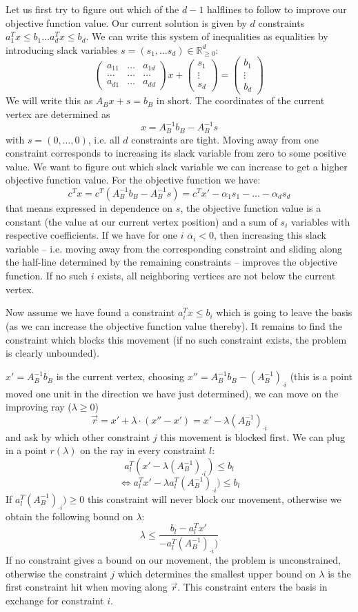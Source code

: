 \documentclass{article}
\newcommand{\setR}{\mathbb{R}}
\newcommand{\mat}[1]{ \begin{pmatrix} #1 \end{pmatrix}}
\begin{document}
Let us first try to figure out which of the $d-1$ halflines to follow to improve our objective function value.
Our current solution is given by $d$ constraints $a_1^Tx\leq b_1 \dots a_d^Tx \leq b_d$. We can write
this system of inequalities as equalities by introducing slack variables $s=(s_1,\dots s_d)\in \setR^d_{\geq0}$:
\[
	\mat{a_{11} & \dots & a_{1d} \\ \dots & \dots & \dots \\ a_{d1} & \dots & a_{dd}} x 
		+ \mat{s_1\\ \vdots \\ s_d} = \mat{b_1\\ \vdots \\ b_d}
\]
We will write this as $A_B x + s = b_B$ in short. The coordinates of the current vertex are determined as 
\[
	x=A_B^{-1}b_B - A_B^{-1}s	
\]
with $s=(0,\dots,0)$, i.e. all $d$ constraints are tight. Moving away from one constraint corresponds to 
increasing its slack variable from zero to some positive value. We want to figure out which slack variable
we can increase to get a higher objective function value. For the objective function we have:
\[
	c^Tx= c^T(A_B^{-1}b_B - A_B^{-1}s)= c^T x' - \alpha_1 s_1 - \dots - \alpha_d s_d
\]
that means expressed in dependence on $s$, the objective function value is a constant (the value at our current
vertex position) and a sum of $s_i$ variables with respective coefficients. If we have for one $i$ 
$\alpha_i<0$, then increasing this slack variable -- i.e. moving away from the corresponding constraint and
sliding along the half-line determined by the remaining constraints -- improves the objective function.
If no such $i$ exists, all neighboring vertices are not below the current vertex.

Now assume we have found a constraint $a_i^T x \leq b_i$
which is going to leave the basis (as we can increase the objective function value thereby). 
It remains to find the constraint which
blocks this movement (if no such constraint exists, the problem is clearly unbounded).

$x'=A_B^{-1}b_B$ is the current vertex, choosing $x''=A_B^{-1}b_B - (A_B^{-1})_{\cdot i}$ (this is a point moved
one unit in the direction we have just determined), we can move 
on the improving ray  ($\lambda\geq 0$)
\[
	\overrightarrow{r}=x' + \lambda \cdot {(x''-x')}
			= x' - \lambda (A_B^{-1})_{\cdot i}
\]
and ask by which other constraint $j$ this movement is blocked first.
We can plug in a point $r(\lambda)$ on the ray in every constraint $l$:
\[
	a_l^{T}(x'-\lambda (A_B^{-1})_{\cdot i})\leq b_l
\]
\[
\Leftrightarrow	a_l^{T}x'-\lambda a_l^{T}(A_B^{-1})_{\cdot i})\leq b_l
\]
If $a_l^{T}(A_B^{-1})_{\cdot i})\geq0$ this constraint will never block our movement, otherwise
we obtain the following bound on $\lambda$:
\[
	\lambda \leq \frac{b_l - a_l^{T}x'}{-a_l^{T}(A_B^{-1})_{\cdot i})}
\]
If no constraint gives a bound on our movement, the problem is unconstrained, otherwise the constraint $j$
which determines the smallest upper bound on $\lambda$ is the first constraint hit when moving along
$\overrightarrow{r}$. This constraint enters the basis in exchange for constraint $i$.
\end{document}
